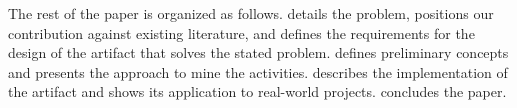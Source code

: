 The rest of the paper is organized as follows.  details the problem, positions our contribution against existing literature, and defines the requirements for the design of the artifact that solves the stated problem. 
 defines preliminary concepts and presents the approach to mine the activities. %
 describes the implementation of the artifact and shows its application to real-world projects. 
 concludes the paper.